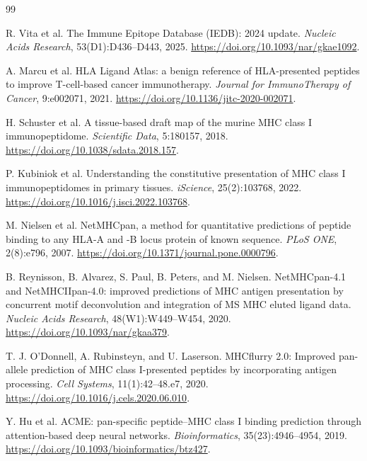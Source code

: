\begingroup
\small
\begin{thebibliography}{99}

R. Vita et al.
\newblock The Immune Epitope Database (IEDB): 2024 update.
\newblock \emph{Nucleic Acids Research}, 53(D1):D436--D443, 2025.
\newblock \url{https://doi.org/10.1093/nar/gkae1092}.

A. Marcu et al.
\newblock HLA Ligand Atlas: a benign reference of HLA-presented peptides to improve T-cell-based cancer immunotherapy.
\newblock \emph{Journal for ImmunoTherapy of Cancer}, 9:e002071, 2021.
\newblock \url{https://doi.org/10.1136/jitc-2020-002071}.

H. Schuster et al.
\newblock A tissue-based draft map of the murine MHC class I immunopeptidome.
\newblock \emph{Scientific Data}, 5:180157, 2018.
\newblock \url{https://doi.org/10.1038/sdata.2018.157}.

P. Kubiniok et al.
\newblock Understanding the constitutive presentation of MHC class I immunopeptidomes in primary tissues.
\newblock \emph{iScience}, 25(2):103768, 2022.
\newblock \url{https://doi.org/10.1016/j.isci.2022.103768}.

M. Nielsen et al.
\newblock NetMHCpan, a method for quantitative predictions of peptide binding to any HLA-A and -B locus protein of known sequence.
\newblock \emph{PLoS ONE}, 2(8):e796, 2007.
\newblock \url{https://doi.org/10.1371/journal.pone.0000796}.

B. Reynisson, B. Alvarez, S. Paul, B. Peters, and M. Nielsen.
\newblock NetMHCpan-4.1 and NetMHCIIpan-4.0: improved predictions of MHC antigen presentation by concurrent motif deconvolution and integration of MS MHC eluted ligand data.
\newblock \emph{Nucleic Acids Research}, 48(W1):W449--W454, 2020.
\newblock \url{https://doi.org/10.1093/nar/gkaa379}.

T. J. O'Donnell, A. Rubinsteyn, and U. Laserson.
\newblock MHCflurry 2.0: Improved pan-allele prediction of MHC class I-presented peptides by incorporating antigen processing.
\newblock \emph{Cell Systems}, 11(1):42--48.e7, 2020.
\newblock \url{https://doi.org/10.1016/j.cels.2020.06.010}.

Y. Hu et al.
\newblock ACME: pan-specific peptide--MHC class I binding prediction through attention-based deep neural networks.
\newblock \emph{Bioinformatics}, 35(23):4946--4954, 2019.
\newblock \url{https://doi.org/10.1093/bioinformatics/btz427}.


\end{thebibliography}
